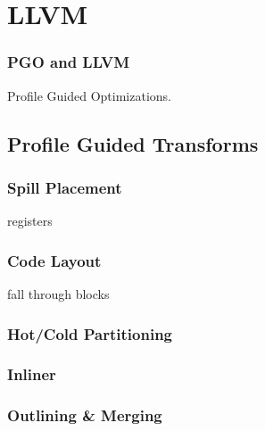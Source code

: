 \section{LLVM}




\subsubsection{PGO and LLVM}

Profile Guided Optimizations.

\subsection{Profile Guided Transforms}

\subsubsection{Spill Placement}
registers

\subsubsection{Code Layout}

fall through blocks

\subsubsection{Hot/Cold Partitioning}



\subsubsection{Inliner}



\subsubsection{Outlining & Merging}
